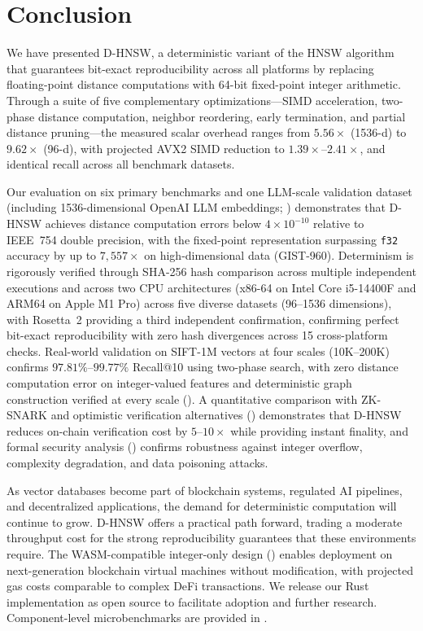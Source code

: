 \documentclass[10pt,journal]{IEEEtran}
\newcommand{\dhnsw}{\textsc{D-HNSW}}
\newcommand{\hnsw}{\textsc{HNSW}}
\begin{document}
\section{Conclusion}
\label{sec:conclusion}

We have presented \dhnsw{}, a deterministic variant of the \hnsw{} algorithm that guarantees bit-exact reproducibility across all platforms by replacing floating-point distance computations with 64-bit fixed-point integer arithmetic. Through a suite of five complementary optimizations---SIMD acceleration, two-phase distance computation, neighbor reordering, early termination, and partial distance pruning---the measured scalar overhead ranges from $5.56\times$ (1536-d) to $9.62\times$ (96-d), with projected AVX2 SIMD reduction to $1.39\times$--$2.41\times$, and identical recall across all benchmark datasets.

Our evaluation on six primary benchmarks and one LLM-scale validation dataset (including 1536-dimensional OpenAI LLM embeddings; ) demonstrates that \dhnsw{} achieves distance computation errors below $4 \times 10^{-10}$ relative to IEEE~754 double precision, with the fixed-point representation surpassing \texttt{f32} accuracy by up to $7{,}557\times$ on high-dimensional data (GIST-960). Determinism is rigorously verified through SHA-256 hash comparison across multiple independent executions and across two CPU architectures (x86-64 on Intel Core i5-14400F and ARM64 on Apple M1 Pro) across five diverse datasets (96--1536 dimensions), with Rosetta~2 providing a third independent confirmation, confirming perfect bit-exact reproducibility with zero hash divergences across 15 cross-platform checks. Real-world validation on SIFT-1M vectors at four scales (10K--200K) confirms $97.81\%$--$99.77\%$ Recall@10 using two-phase search, with zero distance computation error on integer-valued features and deterministic graph construction verified at every scale (). A quantitative comparison with ZK-SNARK and optimistic verification alternatives () demonstrates that \dhnsw{} reduces on-chain verification cost by $5$--$10\times$ while providing instant finality, and formal security analysis () confirms robustness against integer overflow, complexity degradation, and data poisoning attacks.

As vector databases become part of blockchain systems, regulated AI pipelines, and decentralized applications, the demand for deterministic computation will continue to grow. \dhnsw{} offers a practical path forward, trading a moderate throughput cost for the strong reproducibility guarantees that these environments require. The WASM-compatible integer-only design () enables deployment on next-generation blockchain virtual machines without modification, with projected gas costs comparable to complex DeFi transactions. We release our Rust implementation as open source to facilitate adoption and further research. Component-level microbenchmarks are provided in .
\end{document}
